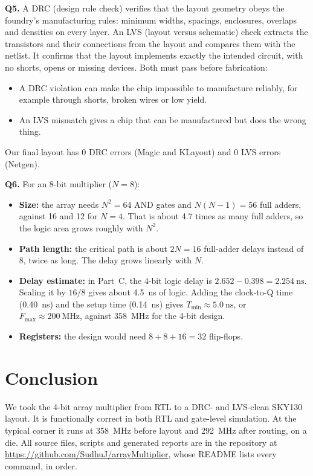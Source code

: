 \documentclass[conference,10pt]{IEEEtran}
\newcommand{\Tmin}{T_{\mathrm{min}}}
\newcommand{\Fmax}{F_{\mathrm{max}}}
\begin{document}
\textbf{Q5.} A DRC (design rule check) verifies that the layout geometry obeys the foundry's
manufacturing rules: minimum widths, spacings, enclosures, overlaps and densities on every layer.
An LVS (layout versus schematic) check extracts the transistors and their connections from the
layout and compares them with the netlist. It confirms that the layout implements exactly the
intended circuit, with no shorts, opens or missing devices. Both must pass before fabrication:
\begin{itemize}
\item A DRC violation can make the chip impossible to manufacture reliably, for example through
shorts, broken wires or low yield.
\item An LVS mismatch gives a chip that can be manufactured but does the wrong thing.
\end{itemize}
Our final layout has 0 DRC errors (Magic and KLayout) and 0 LVS errors (Netgen).

\textbf{Q6.} For an 8-bit multiplier ($N = 8$):
\begin{itemize}
\item \textbf{Size:} the array needs $N^2 = 64$ AND gates and \mbox{$N(N-1) = 56$} full adders, against 16
and 12 for $N = 4$. That is about 4.7 times as many full adders, so the logic area grows roughly
with $N^2$.
\item \textbf{Path length:} the critical path is about $2N = 16$ full-adder delays instead of 8,
twice as long. The delay grows linearly with $N$.
\item \textbf{Delay estimate:} in Part~C, the 4-bit logic delay is
\mbox{$2.652 - 0.398 = \SI{2.254}{\nano\second}$}. Scaling it by $16/8$ gives about
\SI{4.5}{\nano\second} of logic. Adding the clock-to-Q time (\SI{0.40}{\nano\second}) and the
setup time (\SI{0.14}{\nano\second}) gives $\Tmin \approx \SI{5.0}{\nano\second}$, or
$\Fmax \approx \SI{200}{\mega\hertz}$, against \SI{358}{\mega\hertz} for the 4-bit design.
\item \textbf{Registers:} the design would need $8 + 8 + 16 = 32$ flip-flops.
\end{itemize}

\section{Conclusion}
We took the 4-bit array multiplier from RTL to a DRC- and LVS-clean SKY130 layout. It is
functionally correct in both RTL and gate-level simulation. At the typical corner it runs at
\SI{358}{\mega\hertz} before layout and \SI{292}{\mega\hertz} after routing, on a
 die. All source files, scripts and generated reports are in
the repository at \url{https://github.com/SudhuJ/arrayMultiplier}, whose README lists every
command, in order.
\end{document}
